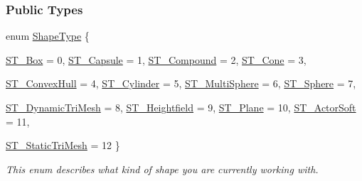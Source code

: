 \subsubsection*{Public Types}
\begin{DoxyCompactItemize}
\item 
enum \hyperlink{classMezzanine_1_1CollisionShape_ad04186055565998879b64176d6dd100d}{ShapeType} \{ \par
\hyperlink{classMezzanine_1_1CollisionShape_ad04186055565998879b64176d6dd100dae9be64274af07a7f8f29bebada214d5e}{ST\_\-Box} = 0, 
\hyperlink{classMezzanine_1_1CollisionShape_ad04186055565998879b64176d6dd100da940b4f486bbd0a25de10bc336e30870c}{ST\_\-Capsule} = 1, 
\hyperlink{classMezzanine_1_1CollisionShape_ad04186055565998879b64176d6dd100da055fc638f933b50c7bfe869f7ee47470}{ST\_\-Compound} = 2, 
\hyperlink{classMezzanine_1_1CollisionShape_ad04186055565998879b64176d6dd100daa25857b0cefdd16e85dd195c7ad8d489}{ST\_\-Cone} = 3, 
\par
\hyperlink{classMezzanine_1_1CollisionShape_ad04186055565998879b64176d6dd100da077fcba1a677c63f12da94dd02931268}{ST\_\-ConvexHull} = 4, 
\hyperlink{classMezzanine_1_1CollisionShape_ad04186055565998879b64176d6dd100da12f7d22b55a3d58ce395bc0fbb536312}{ST\_\-Cylinder} = 5, 
\hyperlink{classMezzanine_1_1CollisionShape_ad04186055565998879b64176d6dd100dac81816d19328b9b19e7c318728d095f6}{ST\_\-MultiSphere} = 6, 
\hyperlink{classMezzanine_1_1CollisionShape_ad04186055565998879b64176d6dd100da950c329f000560c92b241ffb8d6a5203}{ST\_\-Sphere} = 7, 
\par
\hyperlink{classMezzanine_1_1CollisionShape_ad04186055565998879b64176d6dd100da5079488918ad2a3f2adaaa0dfda7bb2d}{ST\_\-DynamicTriMesh} = 8, 
\hyperlink{classMezzanine_1_1CollisionShape_ad04186055565998879b64176d6dd100dae861a5ebc159b7b364ac58474baa3351}{ST\_\-Heightfield} = 9, 
\hyperlink{classMezzanine_1_1CollisionShape_ad04186055565998879b64176d6dd100da8571f53f8a8bcc6126dce27c200655e0}{ST\_\-Plane} = 10, 
\hyperlink{classMezzanine_1_1CollisionShape_ad04186055565998879b64176d6dd100dad26769aea76ec2c46f4fdc90829eeb66}{ST\_\-ActorSoft} = 11, 
\par
\hyperlink{classMezzanine_1_1CollisionShape_ad04186055565998879b64176d6dd100daa1214cb8a95bd027094648ce0617c53e}{ST\_\-StaticTriMesh} = 12
 \}
\begin{DoxyCompactList}\small\item\em This enum describes what kind of shape you are currently working with. \item\end{DoxyCompactList}\end{DoxyCompactItemize}
